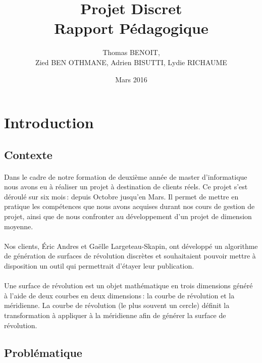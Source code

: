 \documentclass{scrartcl}
\title{Projet Discret\\Rapport Pédagogique}
\author{Thomas BENOIT,\\Zied BEN OTHMANE, Adrien BISUTTI, Lydie RICHAUME}
\date{Mars 2016}
\begin{document}
\maketitle

\tableofcontents
\newpage


\section{Introduction}

\subsection{Contexte}
\paragraph{}
Dans le cadre de notre formation de deuxième année de master d'informatique nous avons eu à réaliser un projet à destination de clients réels. Ce projet s'est déroulé sur six mois\,: depuis Octobre jusqu'en Mars. Il permet de mettre en pratique les compétences que nous avons acquises durant nos cours de gestion de projet, ainsi que de nous confronter au développement d'un projet de dimension moyenne.

\paragraph{}
Nos clients, \'Eric Andres et Gaëlle Largeteau-Skapin, ont développé un algorithme de génération de surfaces de révolution discrètes et souhaitaient pouvoir mettre à disposition un outil qui permettrait d'étayer leur publication.

\paragraph{}
Une surface de révolution est un objet mathématique en trois dimensions généré à l'aide de deux courbes en deux dimensions\,: la courbe de révolution et la méridienne. La courbe de révolution (le plus souvent un cercle) définit la transformation à appliquer à la méridienne afin de générer la surface de révolution.

\subsection{Problématique}
\end{document}
